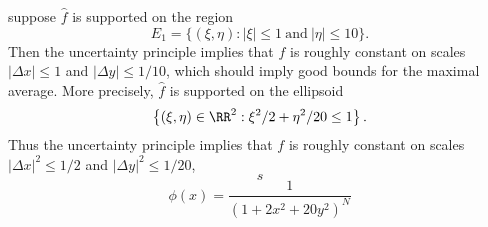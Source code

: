 suppose $\widehat{f}$ is supported on the region
%
\[ E_1 = \{ (\xi,\eta) : |\xi| \leq 1\ \text{and}\ |\eta| \leq 10 \}. \]
%
Then the uncertainty principle implies that $f$ is roughly constant on scales $|\Delta x| \leq 1$ and $|\Delta y| \leq 1/10$, which should imply good bounds for the maximal average. More precisely, $\widehat{f}$ is supported on the ellipsoid
%
\[ \left\{ (\xi,\eta) \in \RR^2 : \xi^2/2 + \eta^2/20 \leq 1 \right\}. \]
%
Thus the uncertainty principle implies that $f$ is roughly constant on scales $|\Delta x|^2 \leq 1/2$ and $|\Delta y|^2 \leq 1/20$,
%
\[ s \]
%
\[ \phi(x) = \frac{1}{( 1 + 2 x^2 + 20 y^2 )^N} \]
